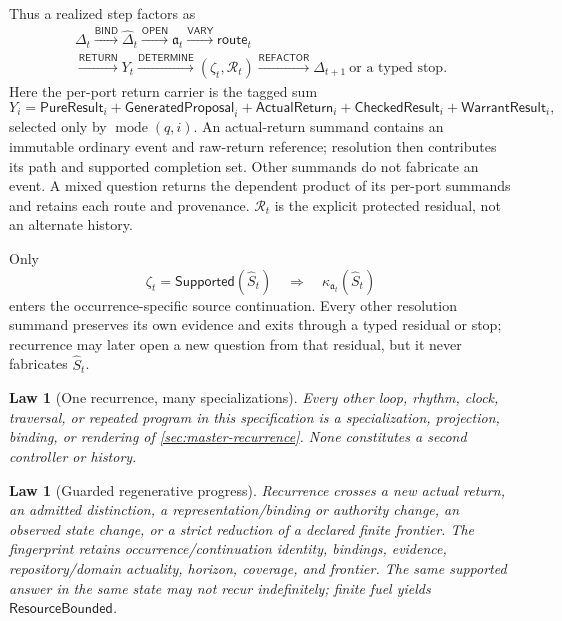 \documentclass[11pt,oneside]{article}
\newtheorem{law}[definition]{Law}
\newcommand{\AskRef}{\mathfrak a}
\begin{document}
Thus a realized step factors as
\[
\boxed{
\begin{aligned}
\Delta_t
\xrightarrow{\mathsf{BIND}}
\widehat\Delta_t
\xrightarrow{\mathsf{OPEN}}
\AskRef_t
\xrightarrow{\mathsf{VARY}}
\mathsf{route}_t\\
{}
\xrightarrow{\mathsf{RETURN}}
Y_t
\xrightarrow{\mathsf{DETERMINE}}
(\zeta_t,\mathcal R_t)
\xrightarrow{\mathsf{REFACTOR}}
\Delta_{t+1}\ \text{or a typed stop}.
\end{aligned}
}
\]
Here the per-port return carrier is the tagged sum
\[
\boxed{
Y_i=
\mathsf{PureResult}_i
+\mathsf{GeneratedProposal}_i
+\mathsf{ActualReturn}_i
+\mathsf{CheckedResult}_i
+\mathsf{WarrantResult}_i,
}
\]
selected only by \(\operatorname{mode}(q,i)\).  An actual-return summand contains an immutable
ordinary event and raw-return reference; resolution then contributes its path and supported
completion set.  Other summands do not fabricate an event.  A mixed question returns the dependent
product of its per-port summands and retains each route and provenance.  \(\mathcal R_t\) is the
explicit protected residual, not an alternate history.

Only
\[
\zeta_t=\mathsf{Supported}(\widehat S_t)
\quad\Longrightarrow\quad
\kappa_{\AskRef_t}(\widehat S_t)
\]
enters the occurrence-specific source continuation.  Every other resolution summand preserves its
own evidence and exits through a typed residual or stop; recurrence may later open a new question
from that residual, but it never fabricates \(\widehat S_t\).

\begin{law}[One recurrence, many specializations]\label{law:one-master-recurrence}
Every other loop, rhythm, clock, traversal, or repeated program in this specification is a
specialization, projection, binding, or rendering of
\cref{sec:master-recurrence}.  None constitutes a second controller or history.
\end{law}

\begin{law}[Guarded regenerative progress]\label{law:master-progress}
Recurrence crosses a new actual return, an admitted distinction, a representation/binding or
authority change, an observed state change, or a strict reduction of a declared finite frontier.
The fingerprint retains occurrence/continuation identity, bindings, evidence, repository/domain
actuality, horizon, coverage, and frontier.  The same supported answer in the same state may not
recur indefinitely; finite fuel yields \(\mathsf{ResourceBounded}\).
\end{law}
\end{document}
